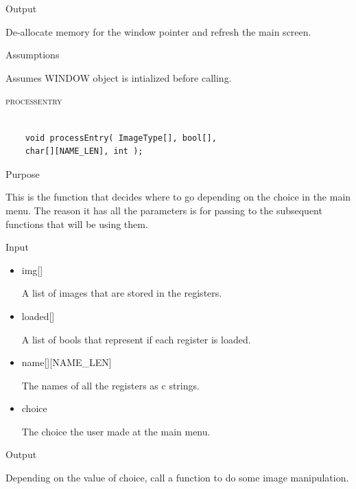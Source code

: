 \documentclass[pdftex, 11pt]{article}
\begin{document}
\begin{description}
\begin{description}
			\item{Output}

				De-allocate memory for the window pointer and refresh the
				main screen.

			\item{Assumptions}

				Assumes WINDOW object is intialized before calling.


		\end{description}


	\item{\textsc{processentry}}

		\begin{lstlisting}

	void processEntry( ImageType[], bool[], 
	char[][NAME_LEN], int );
		\end{lstlisting}

		\begin{description}
			\item{Purpose}

				This is the function that decides where to go depending on the choice in the
				main menu.  The reason it has all the parameters is for passing to the
				subsequent functions that will be using them.

			\item{Input}

				\begin{itemize}

					\item{img[]}

						A list of images that are stored in the registers.

					\item{loaded[]}

						A list of bools that represent if each register is loaded.

					\item{name[][NAME\_LEN]}

						The names of all the registers as c strings.

					\item{choice}
				
						The choice the user made at the main menu.

				\end{itemize}

			\item{Output}

				Depending on the value of choice, call a function to do some image
				manipulation.


\end{description}
\end{description}
\end{document}
